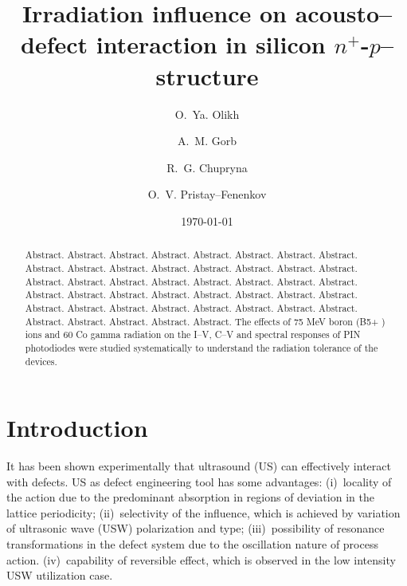 \documentclass[aip,jap, amsmath,amssymb,reprint]{revtex4-1}
\begin{document}

\title{Irradiation influence on  acousto--defect interaction in silicon $n^+$-$p$--structure}
\author{O.~Ya. Olikh}


\author{A.~M. Gorb}


\author{R.~G. Chupryna}

\author{O.~V. Pristay--Fenenkov}%





\date{\today}

\begin{abstract}
Abstract. Abstract. Abstract. Abstract.
Abstract.
Abstract. Abstract. Abstract. Abstract. Abstract. Abstract. Abstract.
Abstract. Abstract. Abstract. Abstract. Abstract.
Abstract. Abstract. Abstract. Abstract. Abstract.
Abstract. Abstract. Abstract.
Abstract. Abstract. Abstract. Abstract.
Abstract. Abstract. Abstract. Abstract. Abstract.
Abstract. Abstract. Abstract.
Abstract. Abstract. Abstract.
Abstract. Abstract. Abstract. Abstract.
Abstract.
The
effects of 75 MeV boron (B5+
) ions and 60
Co gamma radiation on the I–V, C–V and spectral responses of
PIN photodiodes were studied systematically to understand the radiation tolerance of the devices.
\end{abstract}


\maketitle %

\section{Introduction}
It has been shown experimentally that ultrasound (US) can effectively interact with defects.
US as defect engineering tool has some advantages:
(i)~locality of the action due to the predominant absorption in regions of deviation in the lattice periodicity;
(ii)~selectivity of the influence, which is achieved by variation of ultrasonic wave (USW) polarization and type;
(iii)~possibility of resonance transformations in the defect system due to the oscillation nature of process action.
(iv)~capability of reversible effect, which is observed in the low intensity USW utilization case.
\end{document}
